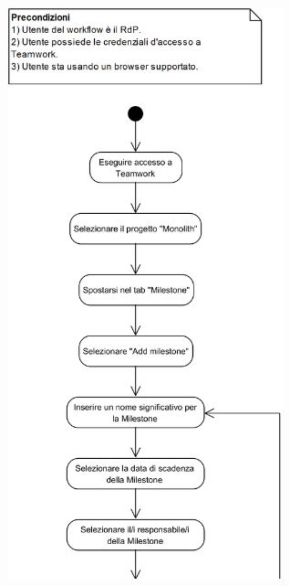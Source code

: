 \begin{center}
	\includegraphics[width=8cm]{../../documenti/NormeDiProgetto/DiagrammiProcedure/CreazioneMilestone1.png}
\end{center}

